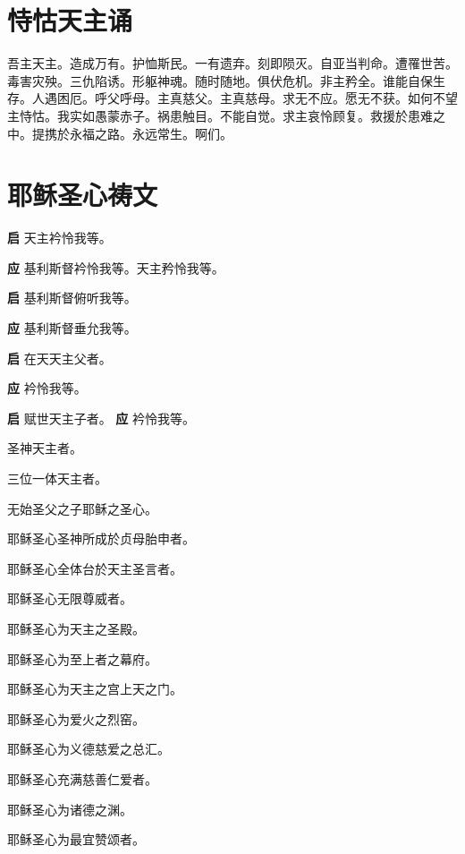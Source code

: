 \documentclass[UTF8,17pt]{ctexart}
\begin{document}
\section{恃怙天主诵}

吾主天主。造成万有。护恤斯民。⼀有遗弃。刻即陨灭。⾃亚当判命。遭罹世苦。毒害灾殃。三仇陷诱。形躯神魂。随时随地。俱伏危机。⾮主矜全。谁能⾃保⽣存。⼈遇困厄。呼⽗呼母。主真慈⽗。主真慈母。求⽆不应。愿⽆不获。如何不望主恃怙。我实如愚蒙⾚⼦。祸患触⽬。不能⾃觉。求主哀怜顾复。救援於患难之中。提携於永福之路。永远常⽣。啊们。

\section{耶稣圣心祷⽂}

\textbf{启} \quad 天主衿怜我等。

\textbf{应} \quad 基利斯督衿怜我等。天主矜怜我等。

\textbf{启} \quad 基利斯督俯听我等。

\textbf{应} \quad 基利斯督垂允我等。

\textbf{启} \quad 在天天主⽗者。

\textbf{应} \quad 衿怜我等。

\textbf{启} \quad 赋世天主⼦者。 \hfill \textbf{应} \quad 衿怜我等。

 圣神天主者。

 三位⼀体天主者。

 ⽆始圣⽗之⼦耶稣之圣⼼。

 耶稣圣⼼圣神所成於贞母胎申者。

 耶稣圣⼼全体台於天主圣⾔者。

 耶稣圣⼼⽆限尊威者。

 耶稣圣⼼为天主之圣殿。

 耶稣圣⼼为⾄上者之幕府。

 耶稣圣⼼为天主之宫上天之门。

 耶稣圣⼼为爱⽕之烈窑。

 耶稣圣心为义德慈爱之总汇。

 耶稣圣⼼充满慈善仁爱者。

 耶稣圣⼼为诸德之渊。

 耶稣圣⼼为最宜赞颂者。
\end{document}
